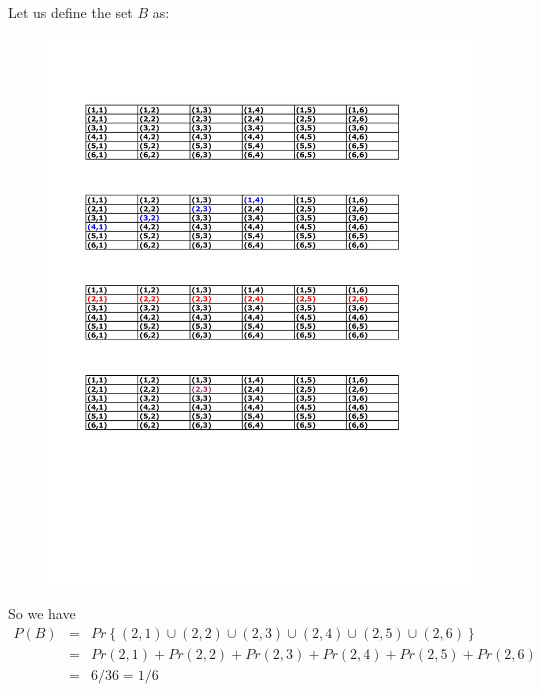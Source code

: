 \documentclass[notes=show,handout]{beamer}\usepackage[]{graphicx}\usepackage[]{color}
\newcommand{\bea}{\begin{eqnarray}}
\newcommand{\eea}{\end{eqnarray}}
\newcommand{\nn}{\nonumber}
\begin{document}
\begin{frame}{\secname}

  \begin{example}[A check]
  Let us define the set $B$ as:

  \begin{figure}[h!]
  \centering
  \includegraphics[scale=0.7]{img/c3.pdf}
  \end{figure}
  So we have
  \footnotesize{
  \bea
  P(B) &=& Pr\left\{ (2,1) \cup (2,2) \cup (2,3) \cup (2,4) \cup (2,5) \cup (2,6)     \right\} \nn \\
   &=&  Pr(2,1) + Pr(2,2) + Pr(2,3) + Pr(2,4) + Pr(2,5) + Pr(2,6) \nn \\
   &=& 6/36 =1/6 \nn
  \eea}

  \end{example}
\end{frame}
\end{document}

